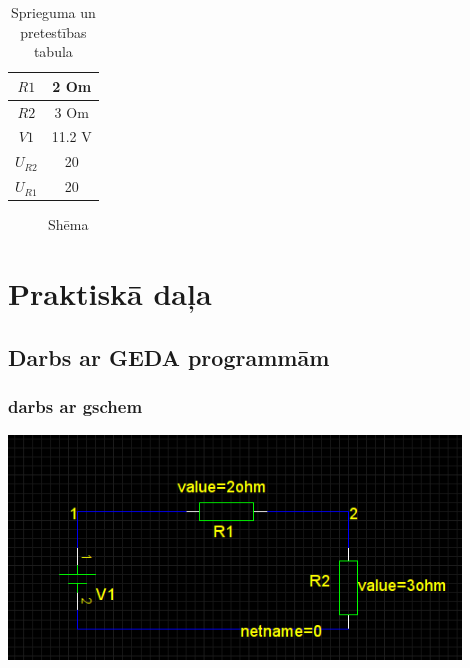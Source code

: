 \documentclass{report}
\begin{document}
\begin {table}[h]
\begin{tabular}{c|c}
\hline
     $R1$ & 2 Om \\
     \hline
     $R2$ & 3 Om \\
     \hline
     $V1$ & 11.2 V \\
     \hline
     $U_{R2}$ & 20 \\
     \hline
     $U_{R1}$ & 20 \\
     \hline
     
\end{tabular}
\caption {Sprieguma un pretestības tabula}
\end {table}
\begin{figure}[h]
    \centering
    \caption{Shēma}
    \label{fig:my_label1}
\end{figure}

\chapter{Praktiskā daļa}
\section{Darbs ar GEDA programmām}
\subsection{darbs ar gschem}
        \includegraphics[width=12cm, height=6cm]{1.png}
\end{document}
